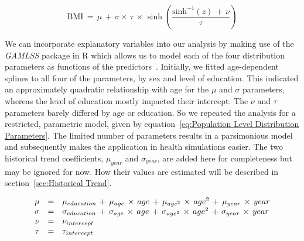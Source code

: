 \documentclass{imammb}
\numberwithin{equation}{section}
\begin{document}
\vspace{-3mm}

\begin{equation}
\label{eq:Sinh-ArcSinh Transformation}
\text{BMI} \, = \, \mu \, + \, \sigma \times \, \tau \, \times \, \sinh \left(\frac{\text{sinh}^{-1}(z) \, + \, \nu}{\tau}\right)
\end{equation}

\vspace{1mm}

We can incorporate explanatory variables into our analysis by making use of the \textit{GAMLSS} package in R which allows us to model each of the four distribution parameters as functions of the predictors~\citep{Rigby2005, Stasinopoulos2007, R2021}. Initially, we fitted age-dependent splines to all four of the parameters, by sex and level of education. This indicated an approximately quadratic relationship with age for the $\mu$ and $\sigma$ parameters, whereas the level of education mostly impacted their intercept. The $\nu$ and $\tau$ parameters barely differed by age or education. So we repeated the analysis for a restricted, parametric model, given by equation~\ref{eq:Population Level Distribution Parameters}. The limited number of parameters results in a parsimonious model and subsequently makes the application in health simulations easier. The two historical trend coefficients, $\mu_{year}$ and $\sigma_{year}$, are added here for completeness but may be ignored for now. How their values are estimated will be described in section~\ref{sec:Historical Trend}.

\vspace{-1mm}

\begin{equation}
\label{eq:Population Level Distribution Parameters}
\begin{array}{@{\ }rcl@{\ }}
\mu & = & \mu_{education} \, + \, \mu_{age} \, \times \, age \, + \, \mu_{age^2} \, \times \, age^2 \, + \, \mu_{year} \, \times \, year\\
\sigma & = & \sigma_{education} \, + \, \sigma_{age} \, \times \, age \, + \, \sigma_{age^2} \, \times \, age^2 \, + \, \sigma_{year} \, \times \, year \\
\nu & = & \nu_{intercept}\\
\tau & = & \tau_{intercept}
\end{array}
\end{equation}

\vspace{-5mm}
\end{document}
